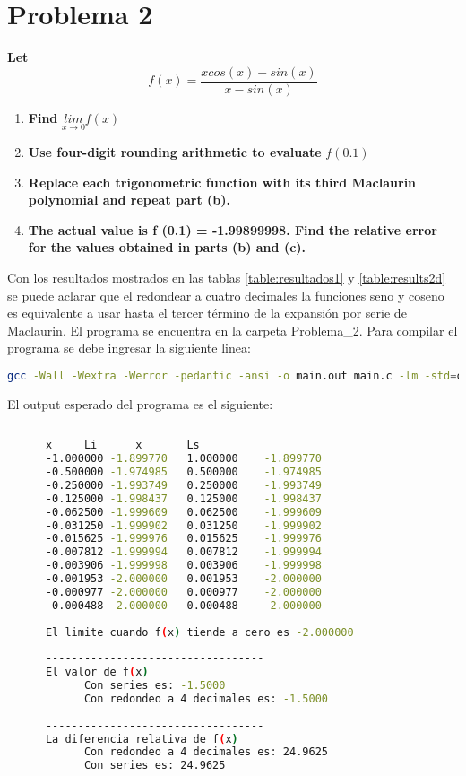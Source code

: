 \section*{Problema 2}
\textbf{Let}
\begin{equation}
      f(x) = \frac{xcos(x)-sin(x)}{x-sin(x)}
      \label{eq:problem2fx}
\end{equation}
\begin{enumerate}
      \item \textbf{Find} $\underset{x\rightarrow 0}{lim} f(x)$

            
      \item \textbf{Use four-digit rounding arithmetic to evaluate} $f(0.1)$

            
      \item \textbf{Replace each trigonometric function with its third Maclaurin polynomial and repeat part (b).}

            
      \item \textbf{The actual value is f (0.1) = -1.99899998. Find the relative error for the values obtained in parts (b) and (c).}

            
\end{enumerate}

Con los resultados mostrados en las tablas \ref{table:resultados1} y \ref{table:results2d}  se puede aclarar que el redondear a cuatro decimales la funciones seno y coseno es equivalente a usar hasta el tercer término de la expansión por serie de Maclaurin. El programa se encuentra en la carpeta \textcolor{citecolor}{Problema\_2}. Para compilar el programa se debe ingresar la siguiente linea:
\begin{lstlisting}[language=bash]
      gcc -Wall -Wextra -Werror -pedantic -ansi -o main.out main.c -lm -std=c11
\end{lstlisting}

El output esperado del programa es el siguiente:

\begin{lstlisting}[language=bash]
      ----------------------------------
      x		Li		x		Ls
      -1.000000	-1.899770	1.000000	-1.899770
      -0.500000	-1.974985	0.500000	-1.974985
      -0.250000	-1.993749	0.250000	-1.993749
      -0.125000	-1.998437	0.125000	-1.998437
      -0.062500	-1.999609	0.062500	-1.999609
      -0.031250	-1.999902	0.031250	-1.999902
      -0.015625	-1.999976	0.015625	-1.999976
      -0.007812	-1.999994	0.007812	-1.999994
      -0.003906	-1.999998	0.003906	-1.999998
      -0.001953	-2.000000	0.001953	-2.000000
      -0.000977	-2.000000	0.000977	-2.000000
      -0.000488	-2.000000	0.000488	-2.000000
      
      El limite cuando f(x) tiende a cero es -2.000000
      
      ----------------------------------
      El valor de f(x)
            Con series es: -1.5000
            Con redondeo a 4 decimales es: -1.5000
      
      ----------------------------------
      La diferencia relativa de f(x)
            Con redondeo a 4 decimales es: 24.9625
            Con series es: 24.9625
\end{lstlisting}
